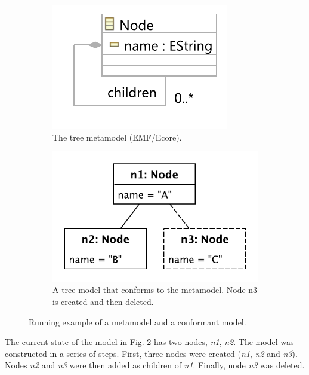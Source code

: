 \documentclass{llncs}
\begin{document}
    \begin{figure}[ht]
        \begin{subfigure}[t]{0.4\linewidth}
            \centering
            \includegraphics[width=0.8\linewidth]{node_metamodel}
            \caption{The tree metamodel (EMF/Ecore).}
            \label{fig:tree_metamodel}
        \end{subfigure}
        \hfill
        \begin{subfigure}[t]{0.6\linewidth}
            \centering
            \includegraphics[width=0.6\linewidth]{initial_chart}
            \caption{A tree model that conforms to the  metamodel.  Node n3 is created and then deleted.}
            \label{fig:initial_model}
        \end{subfigure}
        \caption{Running example of a metamodel and a conformant model.}
        \label{fig:append_speed}
    \end{figure}
    
    The current state of the model in Fig. \ref{fig:initial_model} has two nodes, \emph{n1}, \emph{n2}.  The model was constructed in a series of steps.  First, three nodes were created (\emph{n1}, \emph{n2} and \emph{n3}).
    Nodes \emph{n2} and \emph{n3} were then added as children of \emph{n1}.
    Finally, node \emph{n3} was deleted.
    
\end{document}
